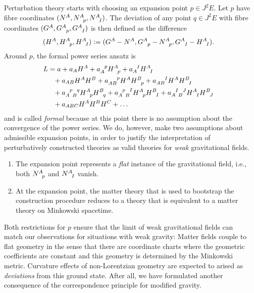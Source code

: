 Perturbation theory starts with choosing an expansion point $p\in J^2E$. Let $p$ have fibre coordinates $(N^A,N^A_{\hphantom Ap},N^A_{\hphantom AI})$. The deviation of any point $q\in J^2E$ with fibre coordinates $(G^A,G^A_{\hphantom Ap},G^A_{\hphantom AI})$ is then defined as the difference
\begin{equation}
  (H^A, H^A_{\hphantom Ap}, H^A_{\hphantom AI}) \vcentcolon= (G^A - N^A, G^A_{\hphantom Ap} - N^A_{\hphantom Ap}, G^A_{\hphantom AI} - H^A_{\hphantom AI}).
\end{equation}
Around $p$, the formal power series ansatz is
\begin{equation}\label{power_series_ansatz}
  \begin{aligned}
    L &{} = a + a_A H^A + a_A^{\hphantom Ap} H^A_{\hphantom Ap} + a_A^{\hphantom AI} H^A_{\hphantom AI} \\
      &{} \hphantom{=} + a_{AB} H^A H^B + a_{AB}^{\hphantom{AB}p} H^A H^B_{\hphantom Bp} + a_{AB}^{\hphantom{AB}I} H^A H^B_{\hphantom BI} \\
      &{} \hphantom{=} + a_{A\hphantom{p}B}^{\hphantom Ap\hphantom{B}q} H^A_{\hphantom Ap} H^B_{\hphantom Bq} + a_{A\hphantom{p}B}^{\hphantom Ap\hphantom{B}I} H^A_{\hphantom Ap} H^B_{\hphantom BI} + a_{A\hphantom{I}B}^{\hphantom AI\hphantom{B}J} H^A_{\hphantom AI} H^B_{\hphantom BJ} \\
      &{} \hphantom{=} + a_{ABC} H^A H^B H^C + \dots
  \end{aligned}
\end{equation}
and is called \emph{formal} because at this point there is no assumption about the convergence of the power series. We do, however, make two assumptions about admissible expansion points, in order to justify the interpretation of perturbatively constructed theories as valid theories for \emph{weak} gravitational fields.
\begin{enumerate}
  \item{The expansion point represents a \emph{flat} instance of the gravitational field, i.e., both $N^A_{\hphantom Ap}$ and $N^A_{\hphantom AI}$ vanish.}
  \item{At the expansion point, the matter theory that is used to bootstrap the construction procedure reduces to a theory that is equivalent to a matter theory on Minkowski spacetime.}
\end{enumerate}
Both restrictions for $p$ ensure that the limit of weak gravitational fields can match our observations for situations with weak gravity: Matter fields couple to flat geometry in the sense that there are coordinate charts where the geometric coefficients are constant and this geometry is determined by the Minkowski metric. Curvature effects of non-Lorentzian geometry are expected to arised as \emph{deviations} from this ground state. After all, we have formulated another consequence of the correspondence principle for modified gravity.

